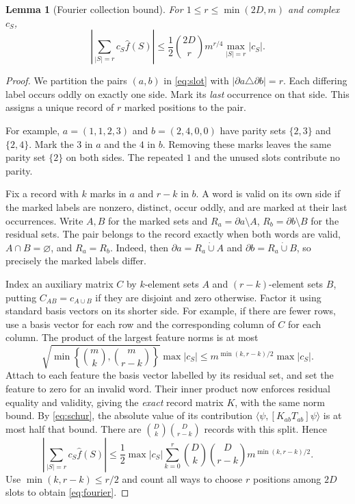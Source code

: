 \documentclass[11pt]{article}
\newtheorem{lemma}[theorem]{Lemma}
\newcommand{\wh}{\widehat}
\newcommand{\1}{\mathbf 1}
\begin{document}
\begin{lemma}[Fourier collection bound]\label{lem:fourier}
For $1\le r\le\min(2D,m)$ and complex $c_S$,
\begin{equation}\label{eq:fourier}
 \left|\sum_{|S|=r}c_S\wh f(S)\right|
 \le\frac12\binom{2D}{r}m^{r/4}\max_{|S|=r}|c_S|.
\end{equation}
\end{lemma}
\begin{proof}
We partition the pairs $(a,b)$ in \eqref{eq:slot} with
$|\partial a\triangle\partial b|=r$. Each differing label occurs oddly
on exactly one side. Mark its \emph{last} occurrence on that side.
This assigns a unique record of $r$ marked positions to the pair.

For example, $a=(1,1,2,3)$ and $b=(2,4,0,0)$ have parity sets
$\{2,3\}$ and $\{2,4\}$. Mark the $3$ in $a$ and the $4$ in $b$.
Removing these marks leaves the same parity set $\{2\}$ on both sides.
The repeated $1$ and the unused slots contribute no parity.

Fix a record with $k$ marks in $a$ and $r-k$ in $b$.
A word is valid on its own side if the marked labels are nonzero,
distinct, occur oddly, and are marked at their last occurrences.
Write $A,B$ for the marked sets and
$R_a=\partial a\setminus A$, $R_b=\partial b\setminus B$ for the
residual sets. The pair belongs to the record exactly when both words
are valid, $A\cap B=\varnothing$, and $R_a=R_b$.
Indeed, then $\partial a=R_a\mathbin{\dot\cup}A$ and
$\partial b=R_a\mathbin{\dot\cup}B$, so precisely the marked labels differ.

Index an auxiliary matrix $C$ by $k$-element sets $A$ and $(r-k)$-element
sets $B$, putting $C_{AB}=c_{A\cup B}$ if they are disjoint and zero
otherwise. Factor it using standard basis vectors on its shorter side.
For example, if there are fewer rows, use a basis vector for each row
and the corresponding column of $C$ for each column. The product of
the largest feature norms is at most
\[
 \sqrt{\min\left\{\binom{m}{k},\binom{m}{r-k}\right\}}\max|c_S|
 \le m^{\min(k,r-k)/2}\max|c_S|.
\]
Attach to each feature the basis vector labelled by its residual set,
and set the feature to zero for an invalid word. Their inner product
now enforces residual equality and validity, giving the \emph{exact}
record matrix $K$, with the same norm bound.
By \eqref{eq:schur}, the absolute value of its contribution
$\langle\psi,[K_{ab}T_{ab}]\psi\rangle$ is at most half that bound.
There are $\binom{D}{k}\binom{D}{r-k}$ records with this split. Hence
\[
 \left|\sum_{|S|=r}c_S\wh f(S)\right|
 \le\frac12\max|c_S|
       \sum_{k=0}^r\binom{D}{k}\binom{D}{r-k}m^{\min(k,r-k)/2}.
\]
Use $\min(k,r-k)\le r/2$ and count all ways to choose $r$ positions
among $2D$ slots to obtain \eqref{eq:fourier}.
\end{proof}
\end{document}
